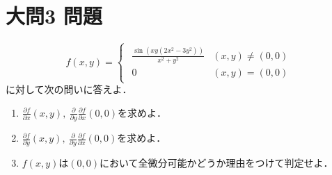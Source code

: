 \documentclass[dvipdfmx]{jsreport}
\begin{document}
\section{大問3 問題}
\begin{tcolorbox} %
\begin{equation*}
	f(x, y)= 
\begin{cases}
\begin{matrix}
	\frac{\sin{(xy(2x^2- 3y^2))}}{x^2+ y^2}& (x, y)\ne (0, 0)\\
	0& (x, y)= (0, 0)
\end{matrix}
\end{cases}
\end{equation*}
	に対して次の問いに答えよ．
\begin{enumerate}
	\item $\frac{\partial f}{\partial x}(x, y),\ \frac{\partial}{\partial y}\frac{\partial f}{\partial x}(0, 0)$を求めよ．
	\item $\frac{\partial f}{\partial y}(x, y),\ \frac{\partial}{\partial y}\frac{\partial f}{\partial x}(0, 0)$を求めよ．
	\item $f(x, y)$は$(0, 0)$において全微分可能かどうか理由をつけて判定せよ．
\end{enumerate}
\end{tcolorbox}
\end{document}
